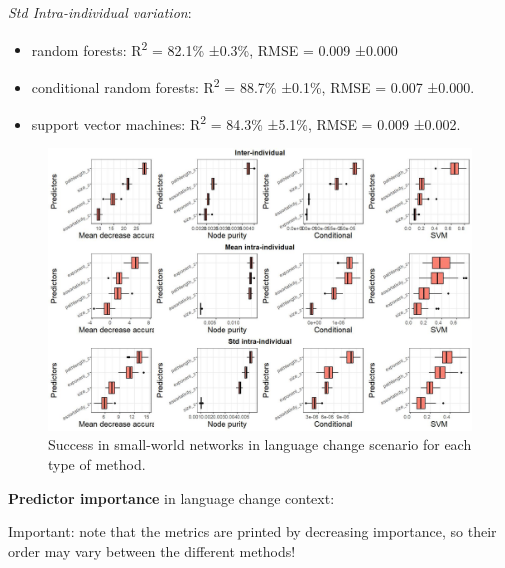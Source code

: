 \documentclass[
]{article}
\providecommand{\tightlist}{%
  \setlength{\itemsep}{0pt}\setlength{\parskip}{0pt}}
\begin{document}
\emph{Std Intra-individual variation}:

\begin{itemize}
\tightlist
\item
  random forests: R\textsuperscript{2} = 82.1\% ±0.3\%, RMSE = 0.009
  ±0.000
\item
  conditional random forests: R\textsuperscript{2} = 88.7\% ±0.1\%, RMSE
  = 0.007 ±0.000.
\item
  support vector machines: R\textsuperscript{2} = 84.3\% ±5.1\%, RMSE =
  0.009 ±0.002.
\end{itemize}

\begin{figure}[!H]

{\centering \includegraphics{./Figures/unnamed-chunk-103-1} 

}

\caption{Success in small-world networks in language change scenario for each type of method.}\label{fig:unnamed-chunk-103}
\end{figure}

\textbf{Predictor importance} in language change context:

Important: note that the metrics are printed by decreasing importance,
so their order may vary between the different methods!
\end{document}
